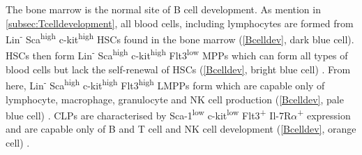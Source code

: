 

The bone marrow is the normal site of B cell development.
As mention in \cref{subsec:Tcelldevelopment}, all blood cells, including lymphocytes are formed from Lin\textsuperscript{-} Sca\textsuperscript{high} c-kit\textsuperscript{high} HSCs found in the bone marrow (\cref{Bcelldev}, dark blue cell).
HSCs then form Lin\textsuperscript{-} Sca\textsuperscript{high} c-kit\textsuperscript{high} Flt3\textsuperscript{low} MPPs which can form all types of blood cells but lack the self-renewal of HSCs (\cref{Bcelldev}, bright blue cell) \citep{Welinder2011}.
From here, Lin\textsuperscript{-} Sca\textsuperscript{high} c-kit\textsuperscript{high} Flt3\textsuperscript{high} LMPPs form which are capable only of lymphocyte, macrophage, granulocyte and NK cell production (\cref{Bcelldev}, pale blue cell) \citep{Adolfsson2005}.
CLPs are characterised by Sca-1\textsuperscript{low} c-kit\textsuperscript{low} Flt3\textsuperscript{+} Il-7R$\alpha$\textsuperscript{+} expression and are capable only of B and T cell and NK cell development (\cref{Bcelldev}, orange cell) \citep{Kondo1997}.



